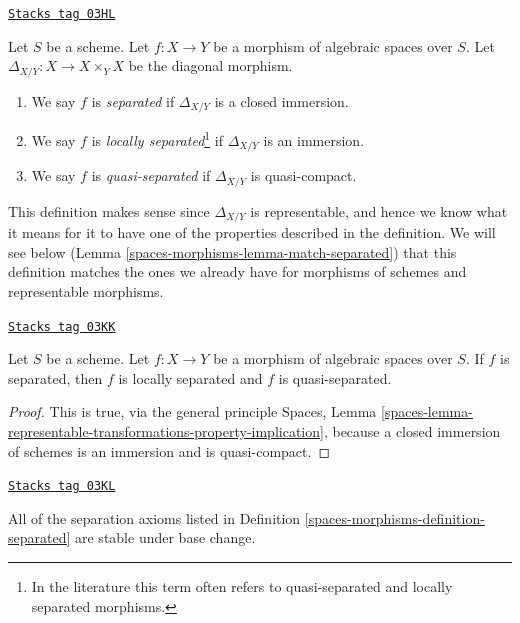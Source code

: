 \begin{definition}[Separated]
\label{spaces-morphisms-definition-separated}
\href{https://stacks.math.columbia.edu/tag/03HL}{\texttt{Stacks tag 03HL}}

Let $S$ be a scheme.
Let $f : X \to Y$ be a morphism of algebraic spaces over $S$.
Let $\Delta_{X/Y} : X \to X \times_Y X$ be the diagonal morphism.
\begin{enumerate}
\item We say $f$ is {\it separated} if $\Delta_{X/Y}$ is a closed immersion.
\item We say $f$ is {\it locally separated}\footnote{In the literature
this term often refers to quasi-separated and locally separated morphisms.}
if $\Delta_{X/Y}$ is an immersion.
\item We say $f$ is {\it quasi-separated} if $\Delta_{X/Y}$ is quasi-compact.
\end{enumerate}
\end{definition}

This definition makes sense since $\Delta_{X/Y}$ is representable,
and hence we know what it means for it to have one of the properties
described in the definition. We will see below
(Lemma \ref{spaces-morphisms-lemma-match-separated}) that this definition matches the ones
we already have for morphisms of schemes and representable morphisms.

\begin{lemma}
\label{spaces-morphisms-lemma-trivial-implications}
\href{https://stacks.math.columbia.edu/tag/03KK}{\texttt{Stacks tag 03KK}}

Let $S$ be a scheme. Let $f : X \to Y$ be a morphism of algebraic spaces
over $S$. If $f$ is separated, then $f$ is locally separated and
$f$ is quasi-separated.
\end{lemma}

\begin{proof}
This is true, via the general principle
Spaces,
Lemma \ref{spaces-lemma-representable-transformations-property-implication},
because a closed immersion of schemes is an immersion and is quasi-compact.
\end{proof}

\begin{lemma}
\label{spaces-morphisms-lemma-base-change-separated}
\href{https://stacks.math.columbia.edu/tag/03KL}{\texttt{Stacks tag 03KL}}

All of the separation axioms listed in Definition \ref{spaces-morphisms-definition-separated}
are stable under base change.
\end{lemma}

